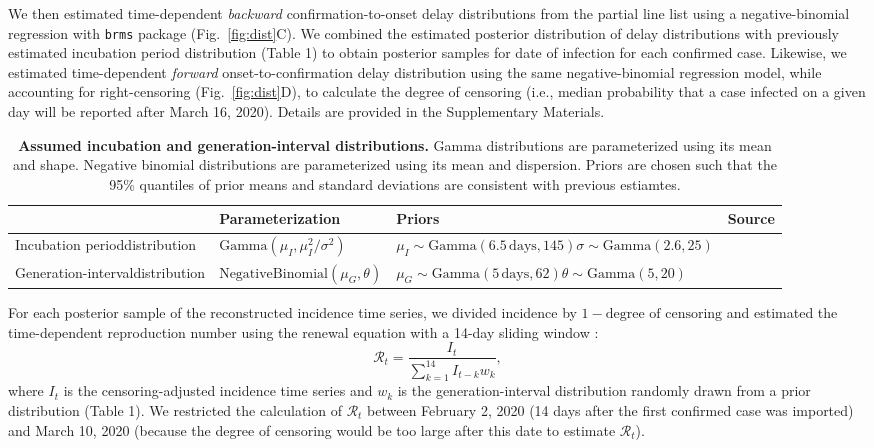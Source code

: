 \documentclass[12pt]{article}
\newcommand{\fref}[1]{Fig.~\ref{fig:#1}}
\begin{document}
We then estimated time-dependent \emph{backward} confirmation-to-onset delay distributions from the partial line list using a negative-binomial regression with \texttt{brms} package \citep{burkner2017brms} (\fref{dist}C).
We combined the estimated posterior distribution of delay distributions with previously estimated incubation period distribution (Table 1) to obtain posterior samples for date of infection for each confirmed case.
Likewise, we estimated time-dependent \emph{forward} onset-to-confirmation delay distribution using the same negative-binomial regression model, while accounting for right-censoring (\fref{dist}D),
to calculate the degree of censoring (i.e., median probability that a case infected on a given day will be reported after March 16, 2020).
Details are provided in the Supplementary Materials.

\begin{table}[t]
\begin{center}
\small
\begin{tabular}{p{4cm}|p{4.5cm}|p{4.7cm}|l}
 & Parameterization & Priors & Source \\
\hline
Incubation period\newline distribution & $\mathrm{Gamma}(\mu_I, \mu_I^2/\sigma^2)$ & $\mu_I\sim \mathrm{Gamma}(6.5\,\textrm{days}, 145)$\newline$\sigma\sim \mathrm{Gamma}(2.6, 25)$ & \citep{backer2020incubation} \\
\hline
Generation-interval\newline distribution & $\mathrm{NegativeBinomial}(\mu_G, \theta)$ & $\mu_G\sim\mathrm{Gamma}(5\,\textrm{days},62)$\newline$\theta\sim\mathrm{Gamma}(5,20)$ & \citep{ferretti2020quantifying, ganyani2020estimating} \\
\hline
\end{tabular}
\end{center}
\caption{
\textbf{Assumed incubation and generation-interval distributions.}
Gamma distributions are parameterized using its mean and shape.
Negative binomial distributions are parameterized using its mean and dispersion.
Priors are chosen such that the 95\% quantiles of prior means and standard deviations are consistent with previous estiamtes.
}
\end{table}

For each posterior sample of the reconstructed incidence time series, we divided incidence by $1-\textrm{degree of censoring}$ and estimated the time-dependent reproduction number using the renewal equation with a 14-day sliding window \citep{fraser2007estimating}:
\begin{equation}
\mathcal R_t = \frac{I_t}{\sum_{k=1}^{14} I_{t-k} w_k},
\end{equation}
where $I_t$ is the censoring-adjusted incidence time series and $w_k$ is the generation-interval distribution randomly drawn from a prior distribution (Table 1).
We restricted the calculation of $\mathcal R_t$ between February 2, 2020 (14 days after the first confirmed case was imported) and March 10, 2020 (because the degree of censoring would be too large after this date to estimate $\mathcal R_t$).
\end{document}
